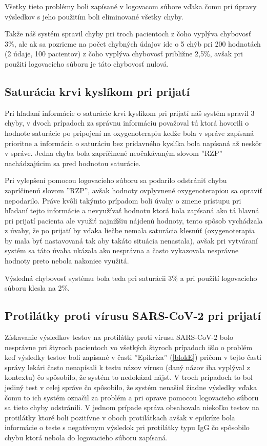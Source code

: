 Všetky tieto problémy boli zapísané v logovacom súbore vďaka čomu pri úpravy výsledkov s jeho použitím boli eliminované všetky chyby.

Takže náš systém spravil chyby pri troch pacientoch z čoho vyplýva chybovosť 3\%, ale ak sa pozrieme na počet chybných údajov ide o 5 chýb pri 200 hodnotách (2 údaje, 100 pacientov) z čoho vyplýva chybovosť približne 2,5\%, avšak pri použití logovacieho súboru je táto chybovosť nulová.     

\subsection{Saturácia krvi kyslíkom pri prijatí}

Pri hľadaní informácie o saturácie krvi kyslíkom pri prijatí náš systém spravil 3 chyby, v dvoch prípadoch za správnu informáciu považoval tú ktorá hovorili o hodnote saturácie po pripojení na oxygenoterapiu keďže bola v správe zapísaná prioritne a informácia o saturáciu bez prídavného kyslíka bola napísaná až neskôr v správe. Jedna chyba bola zapríčinené neočakávaným slovom ''RZP'' nachádzajúcim sa pred hodnotou saturácie.

Pri vylepšení pomocou logovacieho súboru sa podarilo odstrániť chybu zapríčinenú slovom ''RZP'', avšak hodnoty ovplyvnené oxygenoterapiou sa opraviť nepodarilo. Práve kvôli takýmto prípadom boli úvahy o zmene prístupu pri hľadaní tejto informácie a nevyužívať hodnotu ktorá bola zapísaná ako tá hlavná pri prijatí pacienta ale využiť najnižšiu nájdenú hodnoty, tento spôsob vychádzala z úvahy, že po prijatí by vďaka liečbe nemala saturácia klesnúť (oxygenoterapia by mala byť nastavovaná tak aby takáto situácia nenastala), avšak pri vytváraní systém sa táto úvaha ukázala ako nesprávna a často vykazovala nesprávne hodnoty preto nebola nakoniec využitá.

Výsledná chybovosť systému bola teda pri saturácii 3\% a pri použití logovacieho súboru klesla na 2\%.

\subsection{Protilátky proti vírusu SARS-CoV-2 pri prijatí}

Získavanie výsledkov testov na protilátky proti vírusu SARS-CoV-2 bolo nesprávne pri štyroch pacientoch vo všetkých štyroch prípadoch išlo o problém keď výsledky testov boli zapísané v časti ''Epikríza'' (\ref{blokE}) pričom v tejto časti správy lekári často nenapísali k testu názov vírusu (daný názov iba vyplýval z kontextu) čo spôsobilo, že systém to nedokázal nájsť. V troch prípadoch to bol jediný test v celej správe čo spôsobilo, že systém nenašiel žiadne výsledky vďaka čomu to ich systém označil za problém a pri oprave pomocou logovacieho súboru sa tieto chyby odstránili. V jednom prípade správa obsahovala niekoľko testov na protilátky ktoré boli pozitívne v oboch protilátkach avšak v epikríze bola informácie o teste s negatívnym výsledok pri protilátky typu IgG čo spôsobilo chybu ktorá nebola do logovacieho súboru zapísaná.

